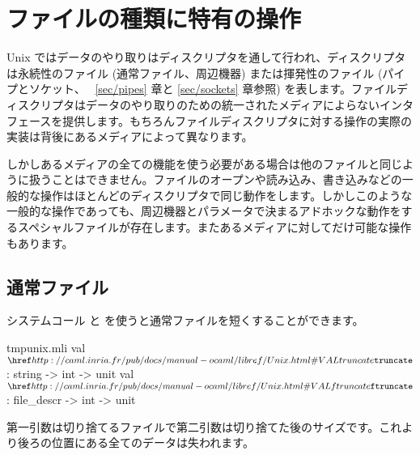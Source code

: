\section{ファイルの種類に特有の操作}

Unix ではデータのやり取りはディスクリプタを通して行われ、ディスクリプタは永続性のファイル (通常ファイル、周辺機器) または揮発性のファイル (パイプとソケット、 ~\ref{sec/pipes} 章と \ref{sec/sockets} 章参照) を表します。ファイルディスクリプタはデータのやり取りのための統一されたメディアによらないインタフェースを提供します。もちろんファイルディスクリプタに対する操作の実際の実装は背後にあるメディアによって異なります。

しかしあるメディアの全ての機能を使う必要がある場合は他のファイルと同じように扱うことはできません。ファイルのオープンや読み込み、書き込みなどの一般的な操作はほとんどのディスクリプタで同じ動作をします。しかしこのような一般的な操作であっても、周辺機器とパラメータで決まるアドホックな動作をするスペシャルファイルが存在します。またあるメディアに対してだけ可能な操作もあります。

\subsection*{通常ファイル}

システムコール  と  を使うと通常ファイルを短くすることができます。
%
\begin{listingcodefile}{tmpunix.mli}
val $\libvalue{Unix}{truncate}$  : string -> int -> unit
val $\libvalue{Unix}{ftruncate}$ : file_descr -> int -> unit
\end{listingcodefile}
%
第一引数は切り捨てるファイルで第二引数は切り捨てた後のサイズです。これより後ろの位置にある全てのデータは失われます。

